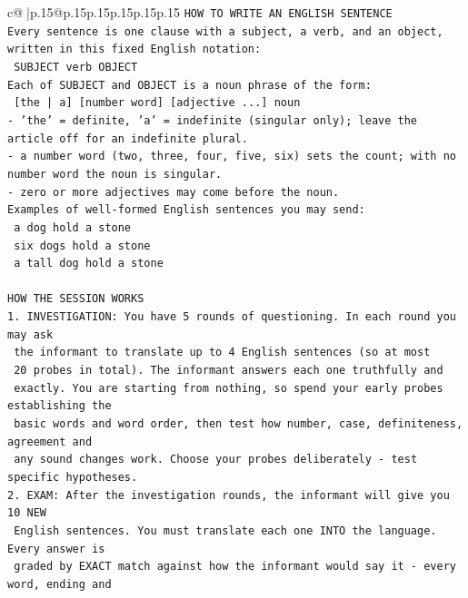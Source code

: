\documentclass{article}
\begin{document}
{\begin{supertabular}{c@{$\;$}|p{.15\linewidth}@{}p{.15\linewidth}p{.15\linewidth}p{.15\linewidth}p{.15\linewidth}p{.15\linewidth}}
{{{\texttt{HOW TO WRITE AN ENGLISH SENTENCE} \\
\texttt{Every sentence is one clause with a subject, a verb, and an object, written in this fixed English notation:} \\
\texttt{    SUBJECT  verb  OBJECT} \\
\texttt{Each of SUBJECT and OBJECT is a noun phrase of the form:} \\
\texttt{    {[}the | a{]}  {[}number word{]}  {[}adjective ...{]}  noun} \\
\texttt{{-} 'the' = definite, 'a' = indefinite (singular only); leave the article off for an indefinite plural.} \\
\texttt{{-} a number word (two, three, four, five, six) sets the count; with no number word the noun is singular.} \\
\texttt{{-} zero or more adjectives may come before the noun.} \\
\texttt{Examples of well{-}formed English sentences you may send:} \\
\texttt{    a dog hold a stone} \\
\texttt{    six dogs hold a stone} \\
\texttt{    a tall dog hold a stone} \\
\\ 
\texttt{HOW THE SESSION WORKS} \\
\texttt{1. INVESTIGATION: You have 5 rounds of questioning. In each round you may ask} \\
\texttt{   the informant to translate up to 4 English sentences (so at most} \\
\texttt{   20 probes in total). The informant answers each one truthfully and} \\
\texttt{   exactly. You are starting from nothing, so spend your early probes establishing the} \\
\texttt{   basic words and word order, then test how number, case, definiteness, agreement and} \\
\texttt{   any sound changes work. Choose your probes deliberately {-} test specific hypotheses.} \\
\texttt{2. EXAM: After the investigation rounds, the informant will give you 10 NEW} \\
\texttt{   English sentences. You must translate each one INTO the language. Every answer is} \\
\texttt{   graded by EXACT match against how the informant would say it {-} every word, ending and} \\
}}}
\end{supertabular}}
\end{document}
